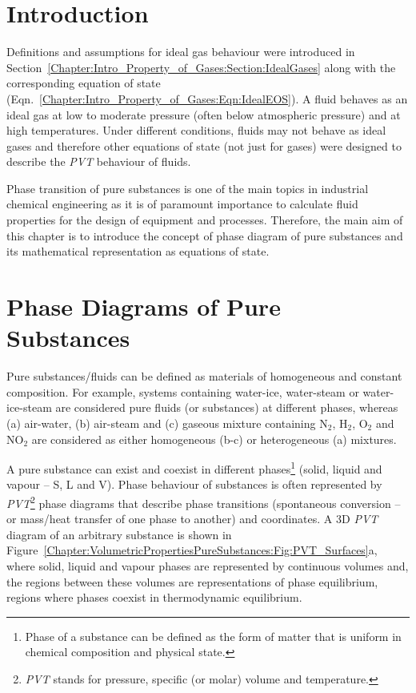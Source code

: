 \localtableofcontents

   \section{Introduction}\label{Chapter:VolumetricPropertiesPureSubstances:Section:Intro}
   Definitions and assumptions for ideal gas behaviour were introduced in Section~\ref{Chapter:Intro_Property_of_Gases:Section:IdealGases} along with the corresponding equation of state (Eqn.~\ref{Chapter:Intro_Property_of_Gases:Eqn:IdealEOS}). A fluid behaves as an ideal gas at low to moderate pressure (often below atmospheric pressure) and at high temperatures. Under different conditions, fluids may not behave as ideal gases and therefore other equations of state (not just for gases) were designed to describe the {\it PVT} behaviour of fluids.

Phase transition of pure substances is one of the main topics in industrial chemical engineering as it is of paramount importance to calculate fluid properties for the design of equipment and processes. Therefore, the main aim of this chapter is to introduce the concept of phase diagram of pure substances and its mathematical representation as equations of state. 

  
   \section{Phase Diagrams of Pure Substances}\label{Chapter:VolumetricPropertiesPureSubstances:Section:PhaseDiagrams}

Pure substances/fluids can be defined as materials of homogeneous and constant composition. For example, systems containing water-ice, water-steam or water-ice-steam are considered pure fluids (or substances) at different phases, whereas (a) air-water, (b) air-steam and (c) gaseous mixture containing N$_{2}$, H$_{2}$, O$_{2}$ and NO$_{2}$ are considered as either homogeneous (b-c) or heterogeneous (a) mixtures.

A pure substance can exist and coexist in different phases\footnote{Phase of a substance can be defined as the form of matter that is uniform in chemical composition and physical state.}  (\ie solid, liquid and vapour -- S, L and V). Phase behaviour of substances is often represented by {\it PVT}\footnote{{\it PVT} stands for pressure, specific (or molar) volume and temperature.} phase diagrams that describe phase transitions (\ie spontaneous conversion -- or mass/heat transfer of one phase to another) and coordinates. A 3D {\it PVT} diagram of an arbitrary substance is shown in Figure~\ref{Chapter:VolumetricPropertiesPureSubstances:Fig:PVT_Surfaces}a, where solid, liquid and vapour phases are represented by continuous volumes and, the regions between these volumes are representations of phase equilibrium, \ie regions where phases coexist in thermodynamic equilibrium.

